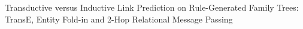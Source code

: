 Transductive versus Inductive Link Prediction on Rule-Generated Family Trees: TransE, Entity Fold-in and 2-Hop Relational Message Passing
